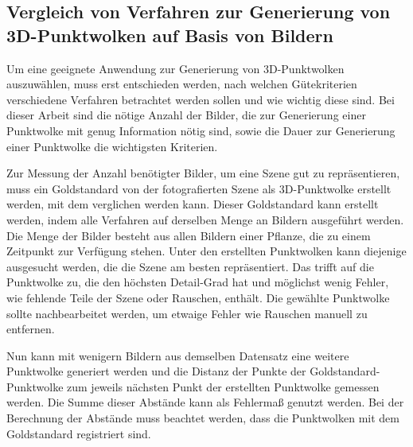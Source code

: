 \documentclass[12pt,titlepage, twoside]{article}
\begin{document}
\subsection{Vergleich von Verfahren zur Generierung von 3D-Punktwolken auf Basis von Bildern}
\label{sec:ergebnisse:sub:point:cloud:generation}

Um eine geeignete Anwendung zur Generierung von 3D-Punktwolken auszuwählen, muss erst entschieden werden, nach welchen Gütekriterien verschiedene Verfahren betrachtet werden sollen und wie wichtig diese sind.
Bei dieser Arbeit sind die nötige Anzahl der Bilder, die zur Generierung einer Punktwolke mit genug Information nötig sind, sowie die Dauer zur Generierung einer Punktwolke die wichtigsten Kriterien.

Zur Messung der Anzahl benötigter Bilder, um eine Szene gut zu repräsentieren, muss ein Goldstandard von der fotografierten Szene als 3D-Punktwolke erstellt werden, mit dem verglichen werden kann.
Dieser Goldstandard kann erstellt werden, indem alle Verfahren auf derselben Menge an Bildern ausgeführt werden. 
Die Menge der Bilder besteht aus allen Bildern einer Pflanze, die zu einem Zeitpunkt zur Verfügung stehen.
Unter den erstellten Punktwolken kann diejenige ausgesucht werden, die die Szene am besten repräsentiert. 
Das trifft auf die Punktwolke zu, die den höchsten Detail-Grad hat und möglichst wenig Fehler, wie fehlende Teile der Szene oder Rauschen, enthält.
Die gewählte Punktwolke sollte nachbearbeitet werden, um etwaige Fehler wie Rauschen manuell zu entfernen.

Nun kann mit wenigern Bildern aus demselben Datensatz eine weitere Punktwolke generiert werden und die Distanz der Punkte der Goldstandard-Punktwolke zum jeweils nächsten Punkt der erstellten Punktwolke gemessen werden.
Die Summe dieser Abstände kann als Fehlermaß genutzt werden. Bei der Berechnung der Abstände muss beachtet werden, dass die Punktwolken mit dem Goldstandard registriert sind.
\end{document}
